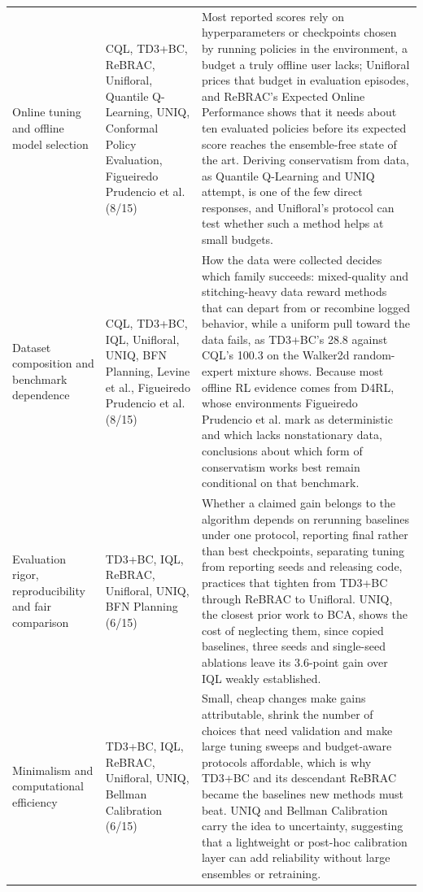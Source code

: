 \documentclass[11pt]{article}
\begin{document}
{\begin{longtable}{P{3.4cm} P{3.6cm} P{8.2cm}}
\addlinespace
Online tuning and offline model selection & CQL, TD3+BC, ReBRAC, Unifloral, Quantile Q-Learning, UNIQ, Conformal Policy Evaluation, Figueiredo Prudencio et al. (8/15) & Most reported scores rely on hyperparameters or checkpoints chosen by running policies in the environment, a budget a truly offline user lacks; Unifloral prices that budget in evaluation episodes, and ReBRAC's Expected Online Performance shows that it needs about ten evaluated policies before its expected score reaches the ensemble-free state of the art. Deriving conservatism from data, as Quantile Q-Learning and UNIQ attempt, is one of the few direct responses, and Unifloral's protocol can test whether such a method helps at small budgets. \\
\addlinespace
Dataset composition and benchmark dependence & CQL, TD3+BC, IQL, Unifloral, UNIQ, BFN Planning, Levine et al., Figueiredo Prudencio et al. (8/15) & How the data were collected decides which family succeeds: mixed-quality and stitching-heavy data reward methods that can depart from or recombine logged behavior, while a uniform pull toward the data fails, as TD3+BC's 28.8 against CQL's 100.3 on the Walker2d random-expert mixture shows. Because most offline RL evidence comes from D4RL, whose environments Figueiredo Prudencio et al. mark as deterministic and which lacks nonstationary data, conclusions about which form of conservatism works best remain conditional on that benchmark. \\
\addlinespace
Evaluation rigor, reproducibility and fair comparison & TD3+BC, IQL, ReBRAC, Unifloral, UNIQ, BFN Planning (6/15) & Whether a claimed gain belongs to the algorithm depends on rerunning baselines under one protocol, reporting final rather than best checkpoints, separating tuning from reporting seeds and releasing code, practices that tighten from TD3+BC through ReBRAC to Unifloral. UNIQ, the closest prior work to BCA, shows the cost of neglecting them, since copied baselines, three seeds and single-seed ablations leave its 3.6-point gain over IQL weakly established. \\
\addlinespace
Minimalism and computational efficiency & TD3+BC, IQL, ReBRAC, Unifloral, UNIQ, Bellman Calibration (6/15) & Small, cheap changes make gains attributable, shrink the number of choices that need validation and make large tuning sweeps and budget-aware protocols affordable, which is why TD3+BC and its descendant ReBRAC became the baselines new methods must beat. UNIQ and Bellman Calibration carry the idea to uncertainty, suggesting that a lightweight or post-hoc calibration layer can add reliability without large ensembles or retraining. \\

\end{longtable}}
\end{document}
